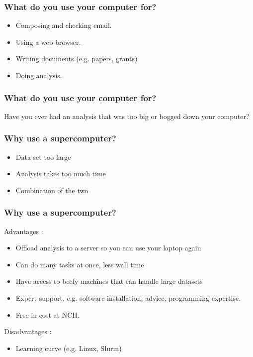 \documentclass{beamer}
\begin{document}
\begin{frame}
\frametitle{What do you use your computer for?}
\begin{itemize}
    \item Composing and checking email.
    \bigskip
    \pause
    \item Using a web browser.
    \bigskip
    \pause
    \item Writing documents (e.g. papers, grants)
    \bigskip
    \pause
    \item Doing analysis.
\end{itemize}
\end{frame}



\begin{frame}
\frametitle{What do you use your computer for?}
Have you ever had an analysis that was too big or bogged down your computer?
\end{frame}


\begin{frame}
\frametitle{Why use a supercomputer?}
\begin{itemize}
    \item Data set too large
    \bigskip
    \pause
    \item Analysis takes too much time
    \bigskip
    \pause
    \item Combination of the two
\end{itemize}
\end{frame}


\begin{frame}
\frametitle{Why use a supercomputer?}
Advantages :
\begin{itemize}
    \pause
    \item Offload analysis to a server so you can use your laptop again
    \medskip
    \pause
    \item Can do many tasks at once, less wall time
    \medskip
    \pause
    \item Have access to beefy machines that can handle large datasets
    \medskip
    \pause
    \item Expert support, e.g. software installation, advice, programming expertise.
    \medskip
    \pause
    \item Free in cost at NCH.
    \pause
\end{itemize}
\bigskip
Disadvantages :
\begin{itemize}
    \pause
    \item Learning curve (e.g. Linux, Slurm)
\end{itemize}
\end{frame}
\end{document}
